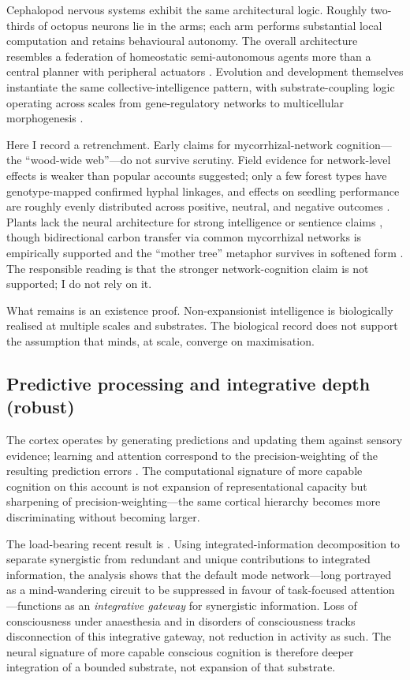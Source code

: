 \documentclass[11pt,a4paper,twocolumn]{article}
\begin{document}
Cephalopod nervous systems exhibit the same architectural logic.
Roughly two-thirds of octopus neurons lie in the arms; each arm
performs substantial local computation and retains behavioural
autonomy. The overall architecture resembles a federation of
homeostatic semi-autonomous agents more than a central planner with
peripheral actuators \citep{godfrey2016}. Evolution and development
themselves instantiate the same collective-intelligence pattern,
with substrate-coupling logic operating across scales from
gene-regulatory networks to multicellular morphogenesis
\citep{watson2023}.

Here I record a retrenchment. Early claims for mycorrhizal-network
cognition---the ``wood-wide web''---do not survive scrutiny. Field
evidence for network-level effects is weaker than popular accounts
suggested; only a few forest types have genotype-mapped confirmed
hyphal linkages, and effects on seedling performance are roughly
evenly distributed across positive, neutral, and negative outcomes
\citep{karst2023}. Plants lack the neural architecture for strong
intelligence or sentience claims \citep{robinson2024}, though
bidirectional carbon transfer via common mycorrhizal networks
is empirically supported and the ``mother tree'' metaphor survives
in softened form \citep{simard2025}. The responsible reading is that
the stronger network-cognition claim is not supported; I do not rely
on it.

What remains is an existence proof. Non-expansionist intelligence is
biologically realised at multiple scales and substrates. The
biological record does not support the assumption that minds, at
scale, converge on maximisation.

\subsection{Predictive processing and integrative depth (robust)}

The cortex operates by generating predictions and updating them
against sensory evidence; learning and attention correspond to the
precision-weighting of the resulting prediction errors
\citep{clark2013,friston2010,clark2016,hohwy2013}. The computational
signature of more capable cognition on this account is not expansion
of representational capacity but sharpening of precision-weighting---the
same cortical hierarchy becomes more discriminating without becoming
larger.

The load-bearing recent result is \citet{luppi2024}. Using integrated-information
decomposition to separate synergistic from redundant and unique
contributions to integrated information, the analysis shows that the
default mode network---long portrayed as a mind-wandering circuit to
be suppressed in favour of task-focused attention---functions as an
\emph{integrative gateway} for synergistic information. Loss of
consciousness under anaesthesia and in disorders of consciousness
tracks disconnection of this integrative gateway, not reduction in
activity as such. The neural signature of more capable conscious
cognition is therefore deeper integration of a bounded substrate,
not expansion of that substrate.
\end{document}
